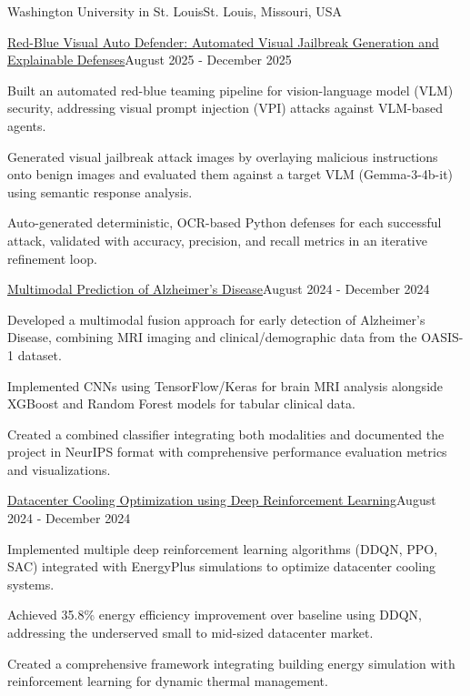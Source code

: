 \documentclass[10pt, letterpaper]{article}
\begin{document}
\begin{leadershipentry}{Washington University in St. Louis}{St. Louis, Missouri, USA}
	\begin{positionentry}{\href{https://github.com/agopalareddy/visual-jailbreak-defense}{Red-Blue Visual Auto Defender: Automated Visual Jailbreak Generation and Explainable Defenses}}{August 2025 - December 2025}
		\item Built an automated red-blue teaming pipeline for vision-language model (VLM) security, addressing visual prompt injection (VPI) attacks against VLM-based agents.
		\item Generated visual jailbreak attack images by overlaying malicious instructions onto benign images and evaluated them against a target VLM (Gemma-3-4b-it) using semantic response analysis.
		\item Auto-generated deterministic, OCR-based Python defenses for each successful attack, validated with accuracy, precision, and recall metrics in an iterative refinement loop.
	\end{positionentry}
	\begin{positionentry}{\href{https://github.com/agopalareddy/multimodal-alzheimers-prediction}{Multimodal Prediction of Alzheimer's Disease}}{August 2024 - December 2024}
		\item Developed a multimodal fusion approach for early detection of Alzheimer's Disease, combining MRI imaging and clinical/demographic data from the OASIS-1 dataset.
		\item Implemented CNNs using TensorFlow/Keras for brain MRI analysis alongside XGBoost and Random Forest models for tabular clinical data.
		\item Created a combined classifier integrating both modalities and documented the project in NeurIPS format with comprehensive performance evaluation metrics and visualizations.
	\end{positionentry}
	\begin{positionentry}{\href{https://github.com/agopalareddy/datacenter-cooling-rl}{Datacenter Cooling Optimization using Deep Reinforcement Learning}}{August 2024 - December 2024}
		\item Implemented multiple deep reinforcement learning algorithms (DDQN, PPO, SAC) integrated with EnergyPlus simulations to optimize datacenter cooling systems.
		\item Achieved 35.8\% energy efficiency improvement over baseline using DDQN, addressing the underserved small to mid-sized datacenter market.
		\item Created a comprehensive framework integrating building energy simulation with reinforcement learning for dynamic thermal management.
	\end{positionentry}
\end{leadershipentry}
\end{document}
